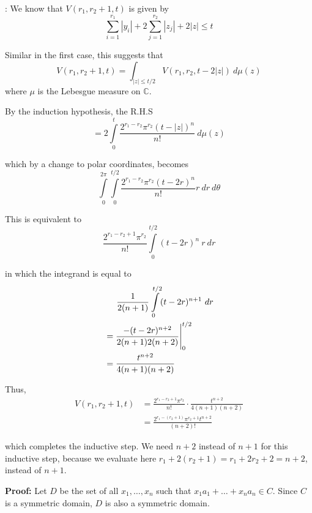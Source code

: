 \documentclass[a4paper, 12pt,oneside,openany]{book}
\begin{document}
: We know that $V(r_1, r_2+1, t)$ is given by $$\sum\limits_{i=1}^{r_1} |y_i| + 2 \sum\limits_{j=1}^{r_2} |z_j|+2|z| \leq t$$

Similar in the first case, this suggests that $$V(r_1, r_2+1, t)=\int_{|z|\leq t/2} V(r_1, r_2, t-2|z|)\ d\mu(z)$$ where $\mu$ is the Lebesgue measure on $\mathbb{C}$.

By the induction hypothesis, the R.H.S $$=2\int\limits_{0}^{t}\frac{2^{r_1-r_2}\pi^{r_2}(t-|z|)^n}{n!} \ d\mu(z)$$

which by a change to polar coordinates, becomes $$\int\limits_{0}^{2\pi}\int\limits_{0}^{t/2} \frac{2^{r_1-r_2}\pi^{r_2}(t-2r)^n}{n!} r \ dr \ d\theta$$

This is equivalent to $$\frac{2^{r_1-r_2+1}\pi^{r_2}}{n!} \int\limits_{0}^{t/2}(t-2r)^n\ r\ dr$$

in which the integrand is equal to 
\begin{align*}
&\hspace{0.5cm} \frac{1}{2(n+1)}\int\limits_{0}^{t/2}(t-2r)^{n+1}\ dr \\
&= \frac{-(t-2r)^{n+2}}{2(n+1)2(n+2)}\Biggr|_0^{t/2} \\
&=\frac{t^{n+2}}{4(n+1)(n+2)}
\end{align*}

Thus, \begin{align*}V(r_1, r_2+1, t) &= \frac{2^{r_1-r_2+1}\pi^{r_2}}{n!}\cdot \frac{t^{n+2}}{4(n+1)(n+2)} \\
&=\frac{2^{r_1-(r_2+1)}\pi^{r_2+1}t^{n+2}}{(n+2)!}
\end{align*}

which completes the inductive step. We need $n+2$ instead of $n+1$ for this inductive step, because we evaluate here $r_1+2(r_2+1)=r_1+2r_2+2=n+2$, instead of $n+1.$ \\


\textbf{Proof:} Let $D$ be the set of all $x_1, \dots, x_n$ such that $x_1a_1+\dots+x_na_n \in C.$ Since $C$ is a symmetric domain, $D$ is also a symmetric domain. 
\end{document}
